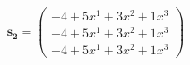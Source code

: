 \documentclass[preview]{standalone}
\begin{document}
\begin{align*}
\mathbf{s_2} = \begin{pmatrix}-4 + 5x^{1} + 3x^{2} + 1x^{3} \\ -4 + 5x^{1} + 3x^{2} + 1x^{3} \\ -4 + 5x^{1} + 3x^{2} + 1x^{3}\end{pmatrix}
\end{align*}
\end{document}
